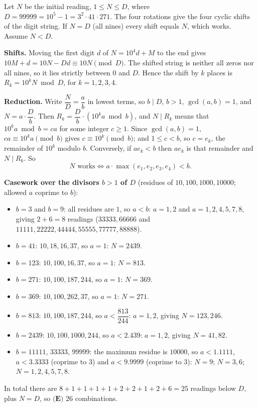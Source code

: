 Let $N$ be the initial reading, $1\le N\le D$, where $D=99999=10^5-1=3^2\cdot41\cdot271$. The four rotations give the four cyclic shifts of the digit string. If $N=D$ (all nines) every shift equals $N$, which works. Assume $N<D$.

\textbf{Shifts.} Moving the first digit $d$ of $N=10^4d+M$ to the end gives $10M+d=10N-Dd\equiv10N\pmod D$. The shifted string is neither all zeros nor all nines, so it lies strictly between $0$ and $D$. Hence the shift by $k$ places is $R_k=10^kN\bmod D$, for $k=1,2,3,4$.

\textbf{Reduction.} Write $\dfrac ND=\dfrac ab$ in lowest terms, so $b\mid D$, $b>1$, $\gcd(a,b)=1$, and $N=a\cdot\dfrac Db$. Then $R_k=\dfrac Db\cdot\left(10^ka\bmod b\right)$, and $N\mid R_k$ means that $10^ka\bmod b=ca$ for some integer $c\ge1$. Since $\gcd(a,b)=1$, $ca\equiv10^ka\pmod b$ gives $c\equiv10^k\pmod b$; and $1\le c<b$, so $c=e_k$, the remainder of $10^k$ modulo $b$. Conversely, if $ae_k<b$ then $ae_k$ is that remainder and $N\mid R_k$. So
\[N\text{ works}\iff a\cdot\max\left(e_1,e_2,e_3,e_4\right)<b.\]

\textbf{Casework over the divisors $b>1$ of $D$} (residues of $10,100,1000,10000$; allowed $a$ coprime to $b$):
\begin{itemize}
\item $b=3$ and $b=9$: all residues are $1$, so $a<b$: $a=1,2$ and $a=1,2,4,5,7,8$, giving $2+6=8$ readings ($33333,66666$ and $11111,22222,44444,55555,77777,88888$).
\item $b=41$: $10,18,16,37$, so $a=1$: $N=2439$.
\item $b=123$: $10,100,16,37$, so $a=1$: $N=813$.
\item $b=271$: $10,100,187,244$, so $a=1$: $N=369$.
\item $b=369$: $10,100,262,37$, so $a=1$: $N=271$.
\item $b=813$: $10,100,187,244$, so $a<\dfrac{813}{244}$: $a=1,2$, giving $N=123,246$.
\item $b=2439$: $10,100,1000,244$, so $a<2.439$: $a=1,2$, giving $N=41,82$.
\item $b=11111$, $33333$, $99999$: the maximum residue is $10000$, so $a<1.1111$, $a<3.3333$ (coprime to $3$) and $a<9.9999$ (coprime to $3$): $N=9$; $N=3,6$; $N=1,2,4,5,7,8$.
\end{itemize}
In total there are $8+1+1+1+1+2+2+1+2+6=25$ readings below $D$, plus $N=D$, so $\boxed{\textbf{(E) } 26}$ combinations.
